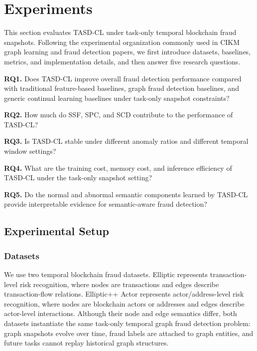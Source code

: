 \section{Experiments}
\label{sec:experiments}

This section evaluates TASD-CL under task-only temporal blockchain fraud snapshots. Following the experimental organization commonly used in CIKM graph learning and fraud detection papers, we first introduce datasets, baselines, metrics, and implementation details, and then answer five research questions.

\textbf{RQ1.} Does TASD-CL improve overall fraud detection performance compared with traditional feature-based baselines, graph fraud detection baselines, and generic continual learning baselines under task-only snapshot constraints?

\textbf{RQ2.} How much do SSF, SPC, and SCD contribute to the performance of TASD-CL?

\textbf{RQ3.} Is TASD-CL stable under different anomaly ratios and different temporal window settings?

\textbf{RQ4.} What are the training cost, memory cost, and inference efficiency of TASD-CL under the task-only snapshot setting?

\textbf{RQ5.} Do the normal and abnormal semantic components learned by TASD-CL provide interpretable evidence for semantic-aware fraud detection?

\subsection{Experimental Setup}
\label{subsec:experimental-setup}

\subsubsection{Datasets}
\label{subsubsec:datasets}

We use two temporal blockchain fraud datasets. Elliptic represents transaction-level risk recognition, where nodes are transactions and edges describe transaction-flow relations. Elliptic++ Actor represents actor/address-level risk recognition, where nodes are blockchain actors or addresses and edges describe actor-level interactions. Although their node and edge semantics differ, both datasets instantiate the same task-only temporal graph fraud detection problem: graph snapshots evolve over time, fraud labels are attached to graph entities, and future tasks cannot replay historical graph structures.

